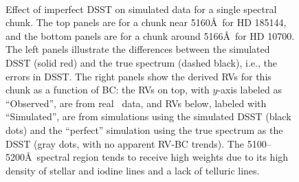 \begin{figure}
\
\caption{Effect of imperfect DSST on simulated data for a single
spectral chunk. The top panels are for a chunk near 5160\AA\ for HD
185144, and the bottom panels are for a chunk around 5166\AA\ for HD
10700. The left panels illustrate the differences between the
simulated DSST (solid red) and the true spectrum (dashed black), i.e.,
the errors in DSST. The right panels show the derived RVs for this
chunk as a function of BC: the RVs on top, with $y$-axis labeled as
``Observed'', are from real \keck\ data, and RVs below, labeled with
``Simulated'', are from simulations using the simulated DSST (black
dots) and the ``perfect'' simulation using the true spectrum as the
DSST (gray dots, with no apparent RV-BC trends). The 5100--5200\AA\
spectral region tends to receive high weights due to its high density
of stellar and iodine lines and a lack of telluric lines.
\label{keck:fig:dsstchunk}}
\end{figure}

